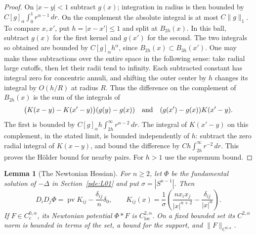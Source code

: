 \documentclass[11pt,oneside,openany]{book}
\theoremstyle{plain}
\newtheorem{lemma}[theorem]{Lemma}
\theoremstyle{definition}
\theoremstyle{remark}
\begin{document}
\begin{proof}
On \(|x-y|<1\) subtract \(g(x)\); integration in radius is then
bounded by \(C[g]_\alpha\int_0^1 r^{\alpha-1}\,dr\).
On the complement the absolute integral is at most \(C\|g\|_1\).
To compare \(x,x'\), put \(h=|x-x'|\leq1\) and split at
\(B_{2h}(x)\). In this ball, subtract \(g(x)\) for the first kernel
and \(g(x')\) for the second. The two integrals so obtained are
bounded by \(C[g]_\alpha h^\alpha\), since \(B_{2h}(x)\subset
B_{3h}(x')\). One may make these subtractions over the entire
space in the following sense: take radial large cutoffs, then
let their radii tend to infinity. Each subtracted constant has
integral zero for concentric annuli, and shifting the outer
center by \(h\) changes its integral by \(O(h/R)\) at radius \(R\).
Thus the difference on the complement of \(B_{2h}(x)\) is the
sum of the integrals of
\[
 \bigl(K(x-y)-K(x'-y)\bigr)(g(y)-g(x))
 \quad\hbox{and}\quad
 (g(x')-g(x))K(x'-y).
\]
The first is bounded by
\(C[g]_\alpha h\int_{2h}^\infty r^{\alpha-2}\,dr\).
The integral of \(K(x'-y)\) on this complement, in the stated
limit, is bounded independently of \(h\): subtract the zero
radial integral of \(K(x-y)\), and bound the difference by
\(Ch\int_{2h}^\infty r^{-2}\,dr\).
This proves the Hölder bound for nearby pairs. For \(h>1\) use
the supremum bound.
\end{proof}

\begin{lemma}[The Newtonian Hessian]\label{pde:elliptic-newton-hessian}
For \(n\geq2\), let \(\Phi\) be the fundamental solution of
\(-\Delta\) in Section~\ref{pde:L01} and put
\(\sigma=|S^{n-1}|\). Then
\[
 D_iD_j\Phi=\operatorname{pv}K_{ij}-\frac{\delta_{ij}}{n}\delta_0,
 \qquad
 K_{ij}(x)=\frac1{\sigma}
      \left(\frac{n x_ix_j}{|x|^{n+2}}-
                       \frac{\delta_{ij}}{|x|^n}\right).
\]
If \(F\in C_c^{0,\alpha}\), its Newtonian potential \(\Phi*F\)
is \(C^{2,\alpha}_{\mathrm{loc}}\).
On a fixed bounded set its \(C^{2,\alpha}\) norm is bounded
in terms of the set, a bound for the support, and \(\|F\|_{C^{0,\alpha}}\).
\end{lemma}
\end{document}
